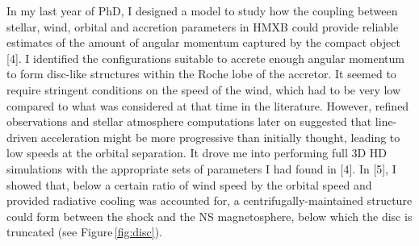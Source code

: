 \documentclass[letterpaper,12pt,onecolumn]{article}
\makeatletter
\newcommand*{\hmxb}{HMXB\@\xspace}
\newcommand*{\ns}{NS\@\xspace}
\makeatother
\begin{document}
In my last year of PhD, I designed a model to study how the coupling between stellar, wind, orbital and accretion parameters in \hmxb could provide reliable estimates of the amount of angular momentum captured by the compact object [4]. I identified the configurations suitable to accrete enough angular momentum to form disc-like structures within the Roche lobe of the accretor. It seemed to require stringent conditions on the speed of the wind, which had to be very low compared to what was considered at that time in the literature. However, refined observations and stellar atmosphere computations later on suggested that line-driven acceleration might be more progressive than initially thought, leading to low speeds at the orbital separation. It drove me into performing full 3D HD simulations with the appropriate sets of parameters I had found in [4]. In [5], I showed that, below a certain ratio of wind speed by the orbital speed and provided radiative cooling was accounted for, a centrifugally-maintained structure could form between the shock and the \ns magnetosphere, below which the disc is truncated (see Figure\,\ref{fig:disc}). 



\newpage
\end{document}
